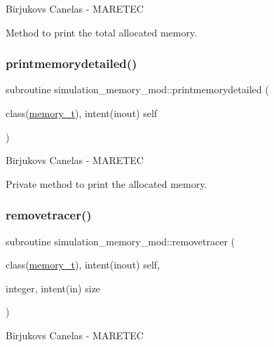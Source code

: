 Birjukovs Canelas -\/ M\+A\+R\+E\+T\+EC 

Method to print the total allocated memory. \mbox{\label{namespacesimulation__memory__mod_a894bd4ec7462fd634d328ee5be4c6483}} 
\subsubsection{\texorpdfstring{printmemorydetailed()}{printmemorydetailed()}}
{\footnotesize\ttfamily subroutine simulation\+\_\+memory\+\_\+mod\+::printmemorydetailed (\begin{DoxyParamCaption}\item[{class(\hyperlink{structsimulation__memory__mod_1_1memory__t}{memory\+\_\+t}), intent(inout)}]{self }\end{DoxyParamCaption})\hspace{0.3cm}{\ttfamily [private]}}



Birjukovs Canelas -\/ M\+A\+R\+E\+T\+EC 

Private method to print the allocated memory. \mbox{\label{namespacesimulation__memory__mod_a5f95539e9740401e7046b79c40ad2ecd}} 
\subsubsection{\texorpdfstring{removetracer()}{removetracer()}}
{\footnotesize\ttfamily subroutine simulation\+\_\+memory\+\_\+mod\+::removetracer (\begin{DoxyParamCaption}\item[{class(\hyperlink{structsimulation__memory__mod_1_1memory__t}{memory\+\_\+t}), intent(inout)}]{self,  }\item[{integer, intent(in)}]{size }\end{DoxyParamCaption})\hspace{0.3cm}{\ttfamily [private]}}



Birjukovs Canelas -\/ M\+A\+R\+E\+T\+EC 

